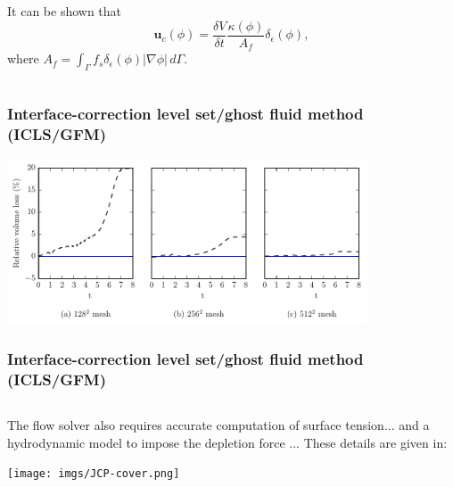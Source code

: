 \begin{frame}[t]
\begin{columns}[T]
\begin{column}{0.5\textwidth}
{\begin{bluecolorbox}
        It can be shown that
        \begin{equation}
          {\bm u}_c(\phi) = \frac{\delta V}{\delta t} \frac{\kappa(\phi)}{A_f} \delta_\epsilon (\phi),
        \end{equation}
        where $A_f = \int_\Gamma f_s \delta_\epsilon (\phi)|\nabla \phi| \,d\Gamma$.
        
      \end{bluecolorbox}
      } %
    \end{column}
    
  \end{columns}

\end{frame}
\begin{frame}[noframenumbering]
  \frametitle{Interface-correction level set/ghost fluid method (ICLS/GFM)}

  \centering
  \includegraphics[width=0.8\textwidth]{../paper1/Figures/serp_loss.pdf}
  \vskip0.3cm

\end{frame}
\begin{frame}[noframenumbering]
  \frametitle{Interface-correction level set/ghost fluid method (ICLS/GFM)}

  \begin{columns}[T]
    
    \begin{column}{\textwidth}
      The flow solver also requires accurate computation of surface tension... \vskip0.2cm
      and a hydrodynamic model to impose the depletion force ... \vskip0.2cm
      \pause
      These details are given in: \vskip0.5cm
      \centering
      \begin{tcolorbox}[beamer,
          width=0.7\textwidth,
          arc=0pt,
          boxsep=1pt,
          left=0pt,right=0pt,top=0pt,bottom=0pt,
        ]
        \texttt{[image: imgs/JCP-cover.png]}
      \end{tcolorbox}
    \end{column}
  \end{columns}

\end{frame}  
